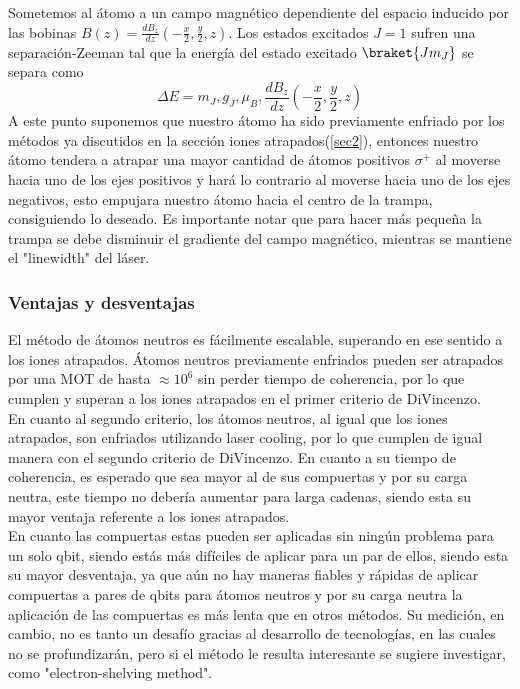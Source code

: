 Sometemos al átomo a un campo magnético dependiente del espacio inducido por las bobinas $B(z)=\frac{dB_{z}}{dz}(-\frac{x}{2},\frac{y}{2},z)$. Los estados excitados $J=1$ sufren una separación-Zeeman tal que la energía del estado excitado $\braket{Jm_{J}}$ se separa como
\begin{equation}
    \Delta E=m_{J},g_{J},\mu_{B},\frac{dB_{z}}{dz}(-\frac{x}{2},\frac{y}{2},z)
\end{equation}
A este punto suponemos que nuestro átomo ha sido previamente enfriado por los métodos ya discutidos en la sección iones atrapados(\ref{sec2}), entonces nuestro átomo tendera a atrapar una mayor cantidad de átomos positivos $\sigma^{+}$ al moverse hacia uno de los ejes positivos y hará lo contrario al moverse hacia uno de los ejes negativos, esto empujara nuestro átomo hacia el centro de la trampa, consiguiendo lo deseado. Es importante notar que para hacer más pequeña la trampa se debe disminuir el gradiente del campo magnético, mientras se mantiene el "linewidth" del láser.
\subsubsection{Ventajas y desventajas}
El método de átomos neutros es fácilmente escalable, superando en ese sentido a los iones atrapados. Átomos neutros previamente enfriados pueden ser atrapados por una MOT de hasta $\approx10^{6}$ sin perder tiempo de coherencia, por lo que cumplen y superan a los iones atrapados en el primer criterio de DiVincenzo.\\
En cuanto al segundo criterio, los átomos neutros, al igual que los iones atrapados, son enfriados utilizando laser cooling, por lo que cumplen de igual manera con el segundo criterio de DiVincenzo. En cuanto a su tiempo de coherencia, es esperado que sea mayor al de sus compuertas y por su carga neutra, este tiempo no debería aumentar para larga cadenas, siendo esta su mayor ventaja referente a los iones atrapados.\\
En cuanto las compuertas estas pueden ser aplicadas sin ningún problema para un solo qbit, siendo estás más difíciles de aplicar para un par de ellos, siendo esta su mayor desventaja, ya que aún no hay maneras fiables y rápidas de aplicar compuertas a pares de qbits para átomos neutros y por su carga neutra la aplicación de las compuertas es más lenta que en otros métodos. Su medición, en cambio, no es tanto un desafío gracias al desarrollo de tecnologías, en las cuales no se profundizarán, pero si el método le resulta interesante se sugiere investigar, como "electron-shelving method".

